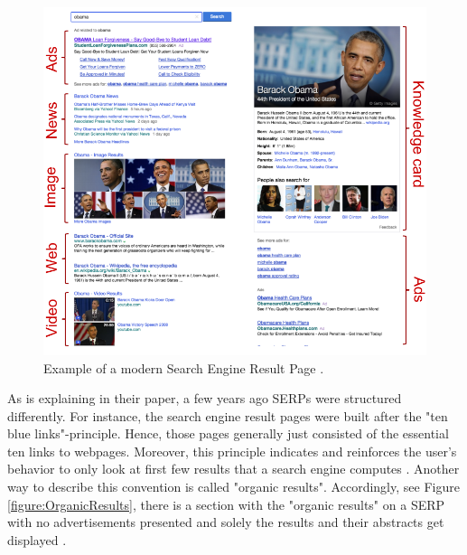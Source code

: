 \begin{figure}[!ht]
    \centering
    \includegraphics[width=1\linewidth]{images/SERP_wang2016beyond.png}
    \caption{
        Example of a modern Search Engine Result Page \autocite[104]{wang2016beyond}.
    }
    \label{figure:ModernSerp}
\end{figure}

As \textcite{lewandowski2015evaluating} is explaining in their paper, a few years ago SERPs were structured differently. For instance, the search engine result pages were built after the "ten blue links"-principle. Hence, those pages generally just consisted of the essential ten links to webpages. Moreover, this principle indicates and reinforces the user's behavior to only look at first few results that a search engine computes \autocite{lewandowski2015evaluating, liu2015influence, wang2016beyond}. Another way to describe this convention is called "organic results". Accordingly, see Figure \ref{figure:OrganicResults}, there is a section with the "organic results" on a SERP with no advertisements presented and solely the results and their abstracts get displayed \autocite{buscher2010good}.

